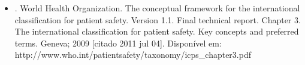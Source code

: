 \documentclass{article}
\begin{document}
\begin{itemize}
\item[%
23] %
. World Health Organization. The conceptual framework for the international
          classification for patient safety. Version 1.1. Final technical report. Chapter 3. The
          international classification for patient safety. Key concepts and preferred terms. Geneva;
          2009 [citado 2011 jul 04]. Disponível em:
          http://www.who.int/patientsafety/taxonomy/icps\_{}chapter3.pdf  
 
\end{itemize}


\end{document}
